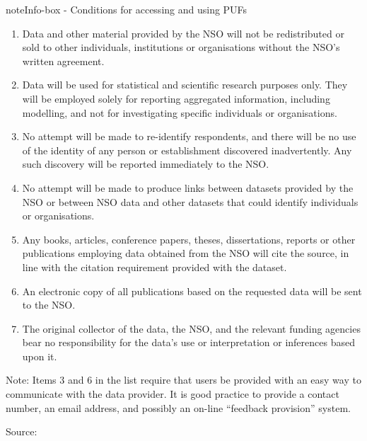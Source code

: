 \documentclass[letterpaper,10pt,english]{sphinxmanual}
\begin{document}
\begin{sphinxadmonition}{note}{Info-box - Conditions for accessing and using PUFs}
\begin{enumerate}
\item {} 
Data and other material provided by the NSO will not be redistributed or sold to other individuals, institutions or organisations without the NSO’s written agreement.

\item {} 
Data will be used for statistical and scientific research purposes only. They will be employed solely for reporting aggregated information, including modelling, and not for investigating specific individuals or organisations.

\item {} 
No attempt will be made to re-identify respondents, and there will be no use of the identity of any person or establishment discovered inadvertently. Any such discovery will be reported immediately to the NSO.

\item {} 
No attempt will be made to produce links between datasets provided by the NSO or between NSO data and other datasets that could identify individuals or organisations.

\item {} 
Any books, articles, conference papers, theses, dissertations, reports or other publications employing data obtained from the NSO will cite the source, in line with the citation requirement provided with the dataset.

\item {} 
An electronic copy of all publications based on the requested data will be sent to the NSO.

\item {} 
The original collector of the data, the NSO, and the relevant funding agencies bear no responsibility for the data’s use or interpretation or inferences based upon it.

\end{enumerate}

Note: Items 3 and 6 in the list require that users be provided with an easy way to communicate with the data provider. It is good practice to provide a contact number, an email address, and possibly an on-line “feedback provision” system.

Source: {\hyperref[\detokenize{release_types:dubo10}]{}}
\end{sphinxadmonition}
\end{document}
